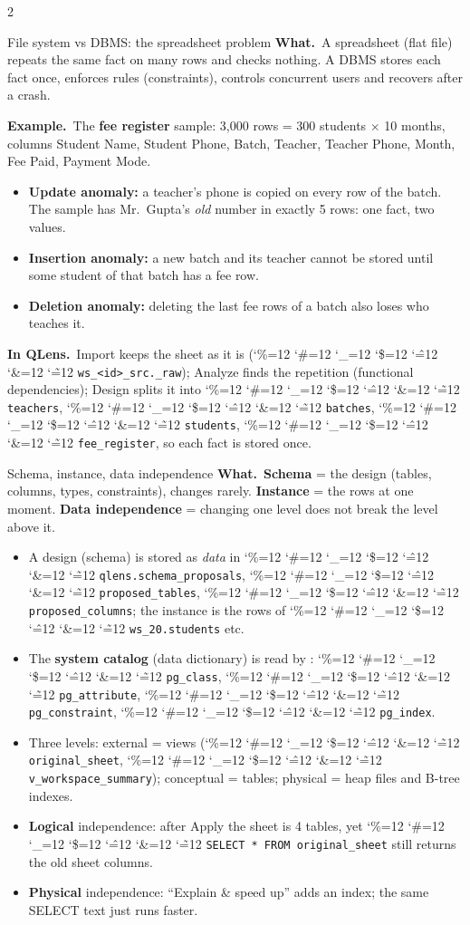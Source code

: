 \documentclass[10pt,a4paper]{article}
\newcommand{\code}{\begingroup\catcode`\%=12 \catcode`\#=12 \catcode`\_=12 \catcode`\$=12
  \catcode`\^=12 \catcode`\&=12 \catcode`\~=12 \codeinner}
\newcommand{\codeinner}[1]{\texttt{#1}\endgroup}
\newcommand{\fn}[1]{{\color{fileclr}\texttt{\detokenize{#1}}}}
\newcommand{\what}{{\color{boxc}\bfseries What.}\ }
\newcommand{\where}{{\color{boxc}\bfseries In QLens.}\ }
\newcommand{\ex}{{\color{boxc}\bfseries Example.}\ }
\begin{document}
\begin{multicols}{2}

\begin{topic}[cIntro]{File system vs DBMS: the spreadsheet problem}
\what A spreadsheet (flat file) repeats the same fact on many rows and checks nothing. A DBMS stores
each fact once, enforces rules (constraints), controls concurrent users and recovers after a crash.

\ex The \textbf{fee register} sample: 3{,}000 rows = 300 students $\times$ 10 months, columns
Student Name, Student Phone, Batch, Teacher, Teacher Phone, Month, Fee Paid, Payment Mode.
\begin{itemize}
  \item \textbf{Update anomaly:} a teacher's phone is copied on every row of the batch. The sample has
  Mr.\ Gupta's \emph{old} number in exactly 5 rows: one fact, two values.
  \item \textbf{Insertion anomaly:} a new batch and its teacher cannot be stored until some student of
  that batch has a fee row.
  \item \textbf{Deletion anomaly:} deleting the last fee rows of a batch also loses who teaches it.
\end{itemize}
\where Import keeps the sheet as it is (\code{ws_<id>_src._raw}); Analyze finds the repetition
(functional dependencies); Design splits it into \code{teachers}, \code{batches}, \code{students},
\code{fee_register}, so each fact is stored once.
\end{topic}

\begin{topic}[cIntro]{Schema, instance, data independence}
\what \textbf{Schema} = the design (tables, columns, types, constraints), changes rarely.
\textbf{Instance} = the rows at one moment. \textbf{Data independence} = changing one level does not
break the level above it.
\begin{itemize}
  \item A design (schema) is stored as \emph{data} in \code{qlens.schema_proposals},
  \code{proposed_tables}, \code{proposed_columns}; the instance is the rows of \code{ws_20.students} etc.
  \item The \textbf{system catalog} (data dictionary) is read by \fn{design/catalog.py:describe L56}:
  \code{pg_class}, \code{pg_attribute}, \code{pg_constraint}, \code{pg_index}.
  \item Three levels: external = views (\code{original_sheet}, \code{v_workspace_summary}); conceptual
  = tables; physical = heap files and B-tree indexes.
  \item \textbf{Logical} independence: after Apply the sheet is 4 tables, yet
  \code{SELECT * FROM original_sheet} still returns the old sheet columns.
  \item \textbf{Physical} independence: ``Explain \& speed up'' adds an index; the same SELECT text
  just runs faster.
\end{itemize}
\end{topic}


\end{multicols}
\end{document}
